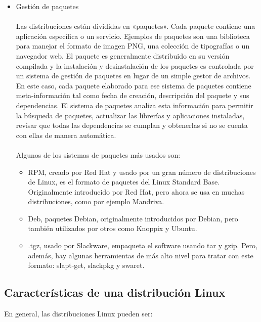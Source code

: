 \begin{itemize}
	\item Gestión de paquetes
	\\
	\\
	Las distribuciones están divididas en «paquetes». Cada paquete contiene una aplicación específica o un servicio. Ejemplos de paquetes son una biblioteca para manejar el formato de imagen PNG, una colección de tipografías o un navegador web.
	El paquete es generalmente distribuido en su versión compilada y la instalación y desinstalación de los paquetes es controlada por un sistema de gestión de paquetes en lugar de un simple gestor de archivos. En este caso, cada paquete elaborado para ese sistema de paquetes contiene meta-información tal como fecha de creación, descripción del paquete y sus dependencias. El sistema de paquetes analiza esta información para permitir la búsqueda de paquetes, actualizar las librerías y aplicaciones instaladas, revisar que todas las dependencias se cumplan y obtenerlas si no 	  se cuenta con ellas de manera automática.	
	\\
	\\
	Algunos de los sistemas de paquetes más usados son:
	\begin{itemize}
		\item RPM, creado por Red Hat y usado por un gran número de distribuciones de Linux, es el formato de paquetes del 		   Linux Standard Base. Originalmente introducido por Red Hat, pero ahora se usa en muchas distribuciones, como por 		   ejemplo Mandriva.
		\item Deb, paquetes Debian, originalmente introducidos por Debian, pero también utilizados por otros como Knoppix y 		   Ubuntu.
		\item .tgz, usado por Slackware, empaqueta el software usando tar y gzip. Pero, además, hay algunas herramientas de 		   más alto nivel para tratar con este formato: slapt-get, slackpkg y swaret.
	\end{itemize}	  
\end{itemize}

\subsection{Características de una distribución Linux}
En general, las distribuciones Linux pueden ser:

